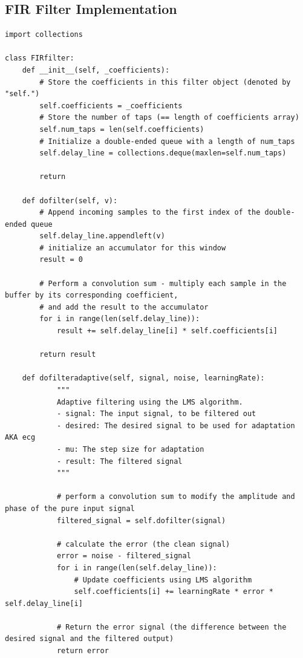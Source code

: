 \documentclass[8pt]{extarticle}
\begin{document}
\subsection{FIR Filter Implementation}
\begin{verbatim}
import collections

class FIRfilter:
    def __init__(self, _coefficients):
        # Store the coefficients in this filter object (denoted by "self.")
        self.coefficients = _coefficients
        # Store the number of taps (== length of coefficients array)
        self.num_taps = len(self.coefficients)
        # Initialize a double-ended queue with a length of num_taps
        self.delay_line = collections.deque(maxlen=self.num_taps)

        return

    def dofilter(self, v):
        # Append incoming samples to the first index of the double-ended queue
        self.delay_line.appendleft(v)
        # initialize an accumulator for this window
        result = 0

        # Perform a convolution sum - multiply each sample in the buffer by its corresponding coefficient,
        # and add the result to the accumulator
        for i in range(len(self.delay_line)):
            result += self.delay_line[i] * self.coefficients[i]

        return result

    def dofilteradaptive(self, signal, noise, learningRate):
            """
            Adaptive filtering using the LMS algorithm.
            - signal: The input signal, to be filtered out
            - desired: The desired signal to be used for adaptation AKA ecg
            - mu: The step size for adaptation
            - result: The filtered signal
            """

            # perform a convolution sum to modify the amplitude and phase of the pure input signal
            filtered_signal = self.dofilter(signal)

            # calculate the error (the clean signal)
            error = noise - filtered_signal
            for i in range(len(self.delay_line)):
                # Update coefficients using LMS algorithm
                self.coefficients[i] += learningRate * error * self.delay_line[i]

            # Return the error signal (the difference between the desired signal and the filtered output)
            return error
\end{verbatim}
\end{document}
